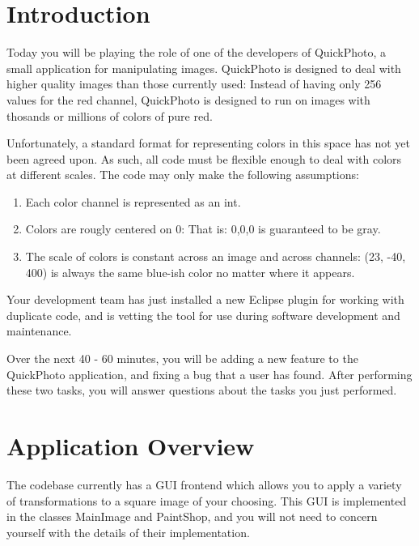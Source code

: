 \documentclass[12pt]{article}
\begin{document}
\maketitle

\section{Introduction}
Today you will be playing the role of one of the developers of
QuickPhoto, a small application for manipulating images. QuickPhoto is 
designed to deal with higher quality images than those currently used:
Instead of having only 256 values for the red channel, QuickPhoto is designed
to run on images with thosands or millions of colors of pure red. 

Unfortunately, a standard format for representing colors in this space has not
yet been agreed upon.  As such, all code must be flexible enough to deal with
colors at different scales.  The code may only make the following assumptions:

\begin{enumerate}
\item Each color channel is represented as an int.
\item Colors are rougly centered on 0: That is: 0,0,0 is guaranteed to be gray.
\item The scale of colors is constant across an image and across channels:
	(23, -40, 400) is always the same blue-ish color no matter where it appears.
\end{enumerate}

Your
development team has just installed a new Eclipse plugin for working
with duplicate code, and is vetting the tool for use during software
development and maintenance.

Over the next 40 - 60 minutes, you will be adding a new feature to the
QuickPhoto application, and fixing a bug that a user has found. After
performing these two tasks, you will answer questions about the tasks
you just performed.

\section{Application Overview}
The codebase currently has a GUI frontend which allows you to apply a variety of 
transformations to a square image of your choosing.  This GUI is implemented in the classes
MainImage and PaintShop, and you will not need to concern yourself with the details of their 
implementation.
\end{document}
